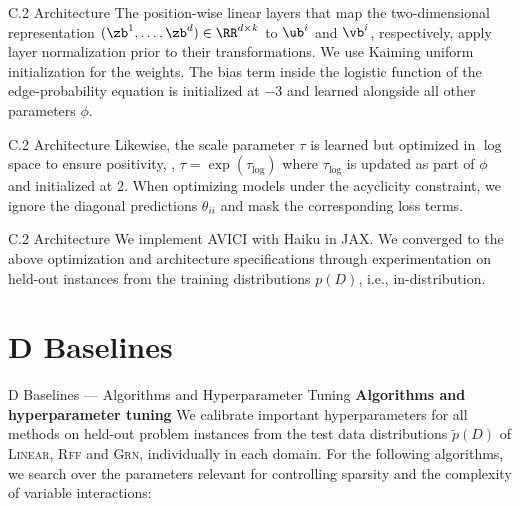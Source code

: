 \documentclass[aspectratio=169,10pt]{beamer}
\newcommand{\domain}[1]{\textsc{#1}}
\newcommand{\lineardomain}{\domain{Linear}\xspace}
\newcommand{\rffdomain}{\domain{Rff}\xspace}
\newcommand{\grndomain}{\domain{Grn}\xspace}
\newcommand{\ours}{AVICI\xspace}
\begin{document}
\begin{frame}{C.2 Architecture}
\small
The position-wise linear layers that map the two-dimensional representation $(\zb^1, \dots, \zb^d)\in \RR^{d \times k}$ to $\ub^i$ and $\vb^i$, respectively, apply layer normalization prior to their transformations. We use Kaiming uniform initialization for the weights. The bias term inside the logistic function of the edge-probability equation is initialized at \num{-3} and learned alongside all other parameters $\phi$.
\end{frame}

\begin{frame}{C.2 Architecture}
Likewise, the scale parameter $\tau$ is learned but optimized in $\log$ space to ensure positivity, \ie, $\tau = \exp(\tau_{\log})$ where $\tau_{\log}$ is updated as part of $\phi$ and initialized at \num{2}. When optimizing models under the acyclicity constraint, we ignore the diagonal predictions $\theta_{ii}$ and mask the corresponding loss terms.
\end{frame}

\begin{frame}{C.2 Architecture}
We implement \ours with Haiku in JAX. We converged to the above optimization and architecture specifications through experimentation on held-out instances from the training distributions $p(D)$, i.e., in-distribution.
\end{frame}

\section{D Baselines}

\begin{frame}{D Baselines --- Algorithms and Hyperparameter Tuning}
\textbf{Algorithms and hyperparameter tuning}\quad
We calibrate important hyperparameters for all methods on held-out problem instances from the test data distributions $\tilde{p}(D)$ of \lineardomain, \rffdomain and \grndomain, individually in each domain. For the following algorithms, we search over the parameters relevant for controlling sparsity and the complexity of variable interactions:
\end{frame}
\end{document}

